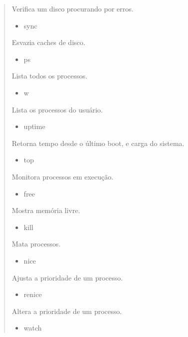 \documentclass[a4paper,10pt,brazil]{sphinxmanual}
\begin{document}
\begin{quote}
\begin{description}
\begin{itemize}
\end{itemize}

Verifica um disco procurando por erros.
\begin{itemize}
\item {} 
sync

\end{itemize}

Esvazia caches de disco.
\begin{itemize}
\item {} 
ps

\end{itemize}

Lista todos os processos.
\begin{itemize}
\item {} 
w

\end{itemize}

Lista os processos do usuário.
\begin{itemize}
\item {} 
uptime

\end{itemize}

Retorna tempo desde o último boot, e carga do sistema.
\begin{itemize}
\item {} 
top

\end{itemize}

Monitora processos em execução.
\begin{itemize}
\item {} 
free

\end{itemize}

Mostra memória livre.
\begin{itemize}
\item {} 
kill

\end{itemize}

Mata processos.
\begin{itemize}
\item {} 
nice

\end{itemize}

Ajusta a prioridade de um processo.
\begin{itemize}
\item {} 
renice

\end{itemize}

Altera a prioridade de um processo.
\begin{itemize}
\item {} 
watch


\end{itemize}
\end{description}
\end{quote}
\end{document}
